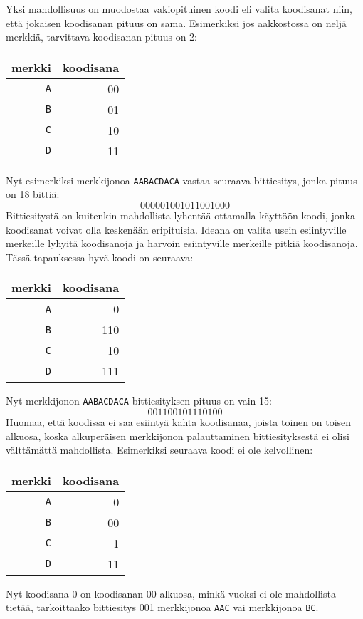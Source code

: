 Yksi mahdollisuus on muodostaa vakiopituinen
koodi eli valita koodisanat niin,
että jokaisen koodisanan pituus on sama.
Esimerkiksi jos aakkostossa on neljä merkkiä,
tarvittava koodisanan pituus on 2:
\begin{center}
\begin{tabular}{rr}
merkki & koodisana \\
\hline
\texttt{A} & 00 \\
\texttt{B} & 01 \\
\texttt{C} & 10 \\
\texttt{D} & 11 \\
\end{tabular}
\end{center}
Nyt esimerkiksi merkkijonoa \texttt{AABACDACA}
vastaa seuraava bittiesitys, jonka pituus on 18 bittiä:
\[000001001011001000\]
Bittiesitystä on kuitenkin mahdollista lyhentää
ottamalla käyttöön koodi, jonka koodisanat voivat
olla keskenään eripituisia.
Ideana on valita usein esiintyville merkeille
lyhyitä koodisanoja ja harvoin esiintyville
merkeille pitkiä koodisanoja.
Tässä tapauksessa hyvä koodi on seuraava:
\begin{center}
\begin{tabular}{rr}
merkki & koodisana \\
\hline
\texttt{A} & 0 \\
\texttt{B} & 110 \\
\texttt{C} & 10 \\
\texttt{D} & 111 \\
\end{tabular}
\end{center}
Nyt merkkijonon \texttt{AABACDACA}
bittiesityksen pituus on vain 15:
\[001100101110100\]
Huomaa, että koodissa ei saa esiintyä kahta koodisanaa,
joista toinen on toisen alkuosa,
koska alkuperäisen merkkijonon palauttaminen
bittiesityksestä ei olisi välttämättä mahdollista.
Esimerkiksi seuraava koodi ei ole kelvollinen:
\begin{center}
\begin{tabular}{rr}
merkki & koodisana \\
\hline
\texttt{A} & 0 \\
\texttt{B} & 00 \\
\texttt{C} & 1 \\
\texttt{D} & 11 \\
\end{tabular}
\end{center}
Nyt koodisana 0 on koodisanan 00 alkuosa,
minkä vuoksi ei ole mahdollista tietää, tarkoittaako bittiesitys
001 merkkijonoa \texttt{AAC} vai merkkijonoa \texttt{BC}.

